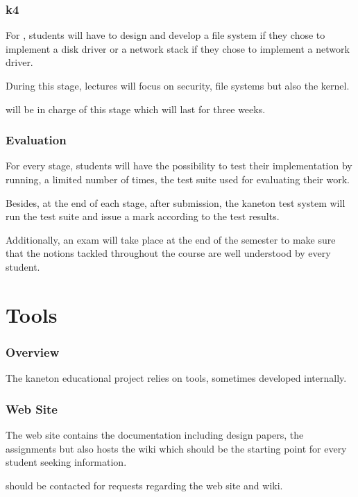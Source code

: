 
\begin{frame}
  \frametitle{k4}

  For , students will have to design and develop a file system
  if they chose to implement a disk driver or a network stack if they chose
  to implement a network driver.

  \-

  During this stage, lectures will focus on security, file systems but also
  the  kernel.

  \-

   will be in charge of this stage which will last for
  three weeks.
\end{frame}


\begin{frame}
  \frametitle{Evaluation}

  For every stage, students will have the possibility to test their
  implementation by running, a limited number of times, the test suite used
  for evaluating their work.

  \-

  Besides, at the end of each stage, after submission, the kaneton test system
  will run the test suite and issue a mark according to the test results.

  \-

  Additionally, an exam will take place at the end of the semester to make
  sure that the notions tackled throughout the course are well understood
  by every student.
\end{frame}

%
%

\section{Tools}


\begin{frame}
  \frametitle{Overview}

  The kaneton educational project relies on tools, sometimes developed
  internally.
\end{frame}


\begin{frame}
  \frametitle{Web Site}

  The web site contains the documentation including design papers,
  the assignments \etc{} but also hosts the wiki which should be
  the starting point for every student seeking information.

  \-

   should be contacted for requests regarding the
  web site and wiki.
\end{frame}

